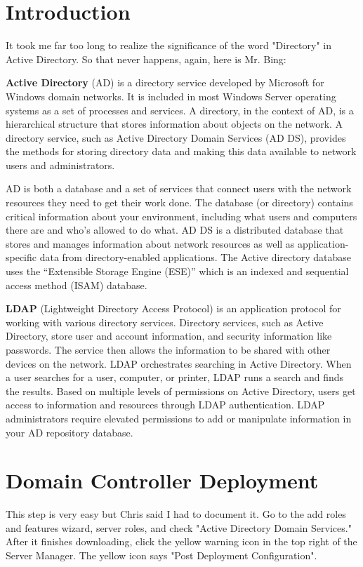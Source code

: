 \documentclass{article}
\begin{document}
\graphicspath{ {./Images/} }
\tableofcontents

\section{Introduction}
It took me far too long to realize the significance of the word "Directory" in Active Directory. So that never happens, again, here is Mr. Bing:

\textbf{Active Directory} (AD) is a directory service developed by Microsoft for Windows domain networks. 
It is included in most Windows Server operating systems as a set of processes and services. 
A directory, in the context of AD, is a hierarchical structure that stores information about objects on the network.
A directory service, such as Active Directory Domain Services (AD DS), provides the methods for storing directory data and making this data available 
to network users and administrators.

AD is both a database and a set of services that connect users with the network resources they need to get their work done. 
The database (or directory) contains critical information about your environment, including what users and computers there are and who’s allowed to do what. 
AD DS is a distributed database that stores and manages information about network resources as well as application-specific data from directory-enabled applications. 
The Active directory database uses the “Extensible Storage Engine (ESE)” which is an indexed and sequential access method (ISAM) database.

\textbf{LDAP} (Lightweight Directory Access Protocol) is an application protocol for working with various directory services. 
Directory services, such as Active Directory, store user and account information, and security information like passwords. 
The service then allows the information to be shared with other devices on the network. LDAP orchestrates searching in Active Directory. 
When a user searches for a user, computer, or printer, LDAP runs a search and finds the results. Based on multiple levels of permissions on Active Directory, 
users get access to information and resources through LDAP authentication. LDAP administrators require elevated permissions to add or manipulate information in 
your AD repository database.

\section{Domain Controller Deployment}
This step is very easy but Chris said I had to document it. 
Go to the add roles and features wizard, server roles, and check
"Active Directory Domain Services." After it finishes downloading,
click the yellow warning icon in the top right of the Server Manager.
The yellow icon says "Post Deployment Configuration".
\end{document}
